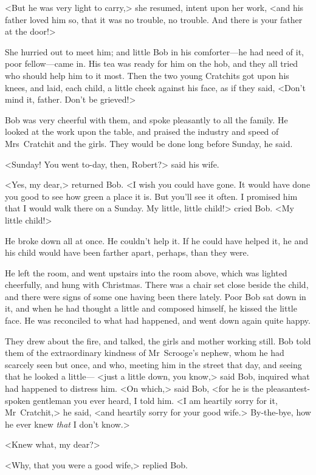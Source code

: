 <But he was very light to carry,> she resumed, intent upon her work, <and his father loved him so, that it was no trouble, no trouble. And there is your father at the door!>

She hurried out to meet him; and little Bob in his comforter—he had need of it, poor fellow—came in. His tea was ready for him on the hob, and they all tried who should help him to it most. Then the two young Cratchits got upon his knees, and laid, each child, a little cheek against his face, as if they said, <Don't mind it, father. Don't be grieved!>

Bob was very cheerful with them, and spoke pleasantly to all the family. He looked at the work upon the table, and praised the industry and speed of Mrs~Cratchit and the girls. They would be done long before Sunday, he said.

<Sunday! You went to-day, then, Robert?> said his wife.

<Yes, my dear,> returned Bob. <I wish you could have gone. It would have done you good to see how green a place it is. But you'll see it often. I promised him that I would walk there on a Sunday. My little, little child!> cried Bob. <My little child!>

He broke down all at once. He couldn't help it. If he could have helped it, he and his child would have been farther apart, perhaps, than they were.

He left the room, and went upstairs into the room above, which was lighted cheerfully, and hung with Christmas. There was a chair set close beside the child, and there were signs of some one having been there lately. Poor Bob sat down in it, and when he had thought a little and composed himself, he kissed the little face. He was reconciled to what had happened, and went down again quite happy.

They drew about the fire, and talked, the girls and mother working still. Bob told them of the extraordinary kindness of Mr~Scrooge's nephew, whom he had scarcely seen but once, and who, meeting him in the street that day, and seeing that he looked a little— <just a little down, you know,> said Bob, inquired what had happened to distress him. <On which,> said Bob, <for he is the pleasantest-spoken gentleman you ever heard, I told him. <I am heartily sorry for it, Mr~Cratchit,> he said, <and heartily sorry for your good wife.> By-the-bye, how he ever knew \textit{that} I don't know.>

<Knew what, my dear?>

<Why, that you were a good wife,> replied Bob.

